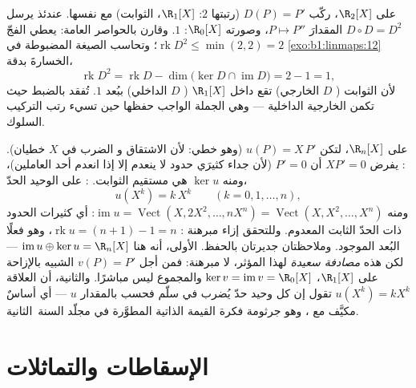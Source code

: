 \begin{example}
\label{ex:b1:linmaps:rankbookkeeping}
على $\R_2[X]$، ركّب  $D(P) = P'$ (رتبتها $2$:
 $\R_1[X]$،  الثوابت) مع نفسها. عندئذ يرسل $D
\circ D = D^2$ المقدارَ $P \mapsto P''$، وصورته $\R_0[X]$: 
$1$. وقارن بالحواصر العامة: يعطي الفجّ
$\operatorname{rk} D^2 \leq \min(2, 2) = 2$؛ وتحاسب الصيغة المضبوطة
في \cref{exo:b1:linmaps:12} الخسارةَ بدقة،
\[
\operatorname{rk} D^2 = \operatorname{rk} D -
\dim\bigl(\ker D \cap \operatorname{im} D\bigr) = 2 - 1 = 1 ,
\]
لأن الثوابت ( $D$ الخارجي) تقع داخل
$\R_1[X]$ ( $D$ الداخلي) ببُعد $1$. 
تُفقد بالضبط حيث تكمن  الخارجية  الداخلية
--- وهي الجملة الواجب حفظها حين تسيء رتب التركيب السلوك.
\end{example}

\begin{example}
\label{ex:b1:linmaps:euler}
على $\R_n[X]$، لتكن $u(P) = X\,P'$ (وهو خطي: لأن الاشتقاق و
الضرب في $X$ خطيان). \emph{}: يفرض $XP' = 0$ أن $P' =
0$ (لأن جداء كثيرَي حدود لا ينعدم إلا إذا انعدم أحد العاملين)،
ومنه  $\ker u$ هي مستقيم الثوابت. \emph{}: على
 الوحيد الحدّ،
\[
u(X^k) = k\,X^{k} \qquad (k = 0, 1, \dots, n),
\]
ومنه $\operatorname{im} u = \operatorname{Vect}(X, 2X^2, \dots,
nX^n) = \operatorname{Vect}(X, X^2, \dots, X^n)$: أي
كثيرات الحدود ذات الحدّ الثابت المعدوم. وللتحقق إزاء مبرهنة :
$\operatorname{rk} u = (n + 1) - 1 = n$، وهو فعلًا البُعد
الموجود. وملاحظتان جديرتان بالحفظ. الأولى، أنه هنا
$\operatorname{im} u \oplus \ker u = \R_n[X]$ --- لكن هذه \emph{مصادفة
سعيدة} لهذا المؤثر، لا مبرهنة: فمن أجل $v(P) = P'$ الشبيه
بالإزاحة على $\R_1[X]$، $\ker v = \operatorname{im}
v = \R_0[X]$ والمجموع ليس مباشرًا. والثانية، أن العلاقة
$u(X^k) = kX^k$ تقول إن كل وحيد حدّ يُضرب في سلّم فحسب بالمقدار $u$ ---
أي أساسٌ مكيَّف مع ، وهو جرثومة فكرة القيمة الذاتية
المطوَّرة في مجلّد السنة~الثانية.
\end{example}

\section{الإسقاطات والتماثلات}

